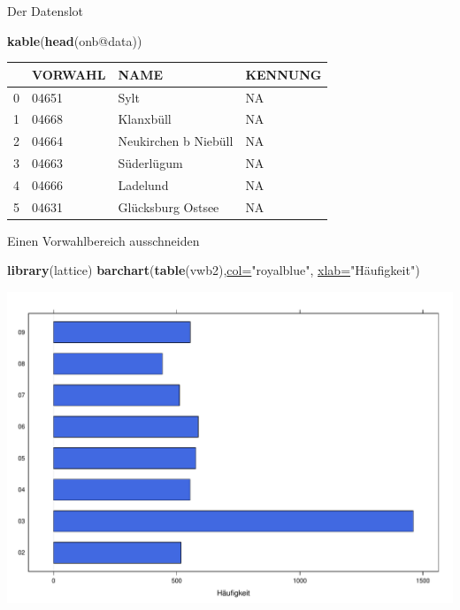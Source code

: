 \documentclass[ignorenonframetext,]{beamer}
\newenvironment{Shaded}{\begin{snugshade}}{\end{snugshade}}
\newcommand{\KeywordTok}[1]{\textcolor[rgb]{0.26,0.66,0.93}{\textbf{#1}}}
\newcommand{\DataTypeTok}[1]{\textcolor[rgb]{0.74,0.68,0.62}{\underline{#1}}}
\newcommand{\DecValTok}[1]{\textcolor[rgb]{0.27,0.67,0.26}{#1}}
\newcommand{\StringTok}[1]{\textcolor[rgb]{0.02,0.61,0.04}{#1}}
\newcommand{\OperatorTok}[1]{\textcolor[rgb]{0.74,0.68,0.62}{#1}}
\newcommand{\NormalTok}[1]{\textcolor[rgb]{0.74,0.68,0.62}{#1}}
\begin{document}
\begin{frame}[fragile]{Der Datenslot}

\begin{Shaded}
\begin{Highlighting}[]
\KeywordTok{kable}\NormalTok{(}\KeywordTok{head}\NormalTok{(onb}\OperatorTok{@}\NormalTok{data))}
\end{Highlighting}
\end{Shaded}

\begin{longtable}[]{@{}llll@{}}
\toprule
& VORWAHL & NAME & KENNUNG\tabularnewline
\midrule
\endhead
0 & 04651 & Sylt & NA\tabularnewline
1 & 04668 & Klanxbüll & NA\tabularnewline
2 & 04664 & Neukirchen b Niebüll & NA\tabularnewline
3 & 04663 & Süderlügum & NA\tabularnewline
4 & 04666 & Ladelund & NA\tabularnewline
5 & 04631 & Glücksburg Ostsee & NA\tabularnewline
\bottomrule
\end{longtable}

\end{frame}

\begin{frame}[fragile]{Einen Vorwahlbereich ausschneiden}

\begin{Shaded}
\end{Shaded}

\begin{Shaded}
\begin{Highlighting}[]
\KeywordTok{library}\NormalTok{(lattice)}
\KeywordTok{barchart}\NormalTok{(}\KeywordTok{table}\NormalTok{(vwb2),}\DataTypeTok{col=}\StringTok{"royalblue"}\NormalTok{,}
         \DataTypeTok{xlab=}\StringTok{"Häufigkeit"}\NormalTok{)}
\end{Highlighting}
\end{Shaded}

\includegraphics{Geomedizin_files/figure-beamer/unnamed-chunk-86-1.pdf}

\end{frame}
\end{document}
